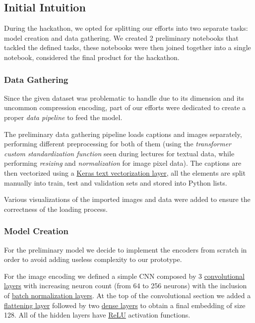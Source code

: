 \documentclass[12pt, a4paper]{article}
\begin{document}
\subsection{Initial Intuition}
During the hackathon, we opted for splitting our efforts into two separate tasks: model creation and data gathering.
We created 2 preliminary notebooks that tackled the defined tasks, these notebooks were then joined together into a single notebook, considered the final product for the hackathon.

\subsubsection{Data Gathering}
Since the given dataset was problematic to handle due to its dimension and its uncommon compression encoding, part of our efforts were dedicated to create a proper \textit{data pipeline} to feed the model.

The preliminary data gathering pipeline loads captions and images separately, performing different preprocessing for both of them (using the \textit{transformer custom standardization function} seen during lectures for textual data, while performing \textit{resizing} and \textit{normalization} for image pixel data).
The captions are then vectorized using a \href{https://www.tensorflow.org/api_docs/python/tf/keras/layers/TextVectorization}{Keras text vectorization layer}, all the elements are split manually into train, test and validation sets and stored into Python lists.

Various visualizations of the imported images and data were added to ensure the correctness of the loading process.

\subsubsection{Model Creation}
For the preliminary model we decide to implement the encoders from scratch in order to avoid adding useless complexity to our prototype.

For the image encoding we defined a simple CNN composed by 3 \href{https://www.tensorflow.org/api_docs/python/tf/keras/layers/Conv2D}{convolutional layers} with increasing neuron count (from 64 to 256 neurons) with the inclusion of \href{https://www.tensorflow.org/api_docs/python/tf/keras/layers/BatchNormalization}{batch normalization layers}.
At the top of the convolutional section we added a \href{https://www.tensorflow.org/api_docs/python/tf/keras/layers/Flatten}{flattening layer} followed by two \href{https://www.tensorflow.org/api_docs/python/tf/keras/layers/Dense}{dense layers} to obtain a final embedding of size 128.
All of the hidden layers have \href{https://www.tensorflow.org/api_docs/python/tf/keras/layers/ReLU}{ReLU} activation functions.
\end{document}
